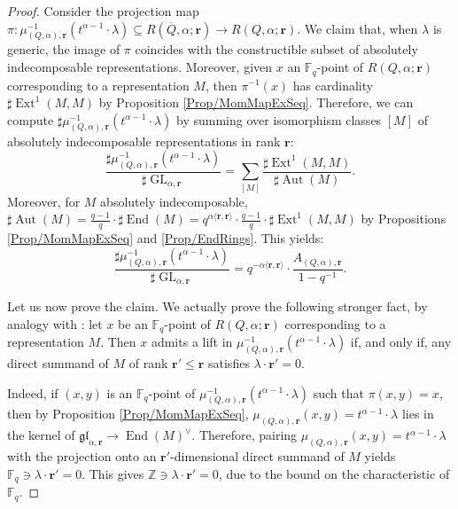 \documentclass[11pt,english]{article}
\numberwithin{equation}{section}
\numberwithin{figure}{section}
\theoremstyle{definition}
\theoremstyle{plain}
\theoremstyle{remark}
\DeclareMathOperator{\End}{End}
\DeclareMathOperator{\Aut}{Aut}
\DeclareMathOperator{\Ext}{Ext}
\DeclareMathOperator{\GL}{GL}
\newcommand\rr{\mathbf{r}}
\newcommand\ZZ{\mathbb{Z}}
\newcommand\FF{\mathbb{F}}
\begin{document}
\begin{proof}

Consider the projection map $\pi:\mu_{(Q,\alpha),\rr}^{-1}(t^{\alpha-1}\cdot\lambda)\subseteq R(\overline{Q},\alpha;\rr)\rightarrow R(Q,\alpha;\rr)$.
We claim that, when $\lambda$ is generic, the image of $\pi$ coincides
with the constructible subset of absolutely indecomposable representations.
Moreover, given $x$ an $\FF_{q}$-point of $R(Q,\alpha;\rr)$ corresponding
to a representation $M$, then $\pi^{-1}(x)$ has cardinality $\sharp\Ext^{1}(M,M)$
by Proposition \ref{Prop/MomMapExSeq}. Therefore, we can compute
$\sharp\mu_{(Q,\alpha),\rr}^{-1}(t^{\alpha-1}\cdot\lambda)$ by summing
over isomorphism classes $[M]$ of absolutely indecomposable representations
in rank $\rr$:\[
\frac{\sharp\mu_{(Q,\alpha),\rr}^{-1}(t^{\alpha-1}\cdot\lambda)}{\sharp\GL_{\alpha,\rr}}
=
\sum_{[M]}\frac{\sharp\Ext^1(M,M)}{\sharp\Aut(M)}.
\] Moreover, for $M$ absolutely indecomposable, $\sharp\Aut(M)=\frac{q-1}{q}\cdot\sharp\End(M)=q^{\alpha\langle\rr,\rr\rangle}\cdot\frac{q-1}{q}\cdot\sharp\Ext^{1}(M,M)$
by Propositions \ref{Prop/MomMapExSeq} and \ref{Prop/EndRings}.
This yields:\[
\frac{\sharp\mu_{(Q,\alpha),\rr}^{-1}(t^{\alpha-1}\cdot\lambda)}{\sharp\GL_{\alpha,\rr}}
=q^{-\alpha\langle\rr,\rr\rangle}\cdot\frac{A_{(Q,\alpha),\rr}}{1-q^{-1}}.
\]

Let us now prove the claim. We actually prove the following stronger
fact, by analogy with \cite[Thm. 3.3.]{CB01}: let $x$ be an $\FF_{q}$-point
of $R(Q,\alpha;\rr)$ corresponding to a representation $M$. Then
$x$ admits a lift in $\mu_{(Q,\alpha),\rr}^{-1}(t^{\alpha-1}\cdot\lambda)$
if, and only if, any direct summand of $M$ of rank $\rr'\leq\rr$
satisfies $\lambda\cdot\rr'=0$.

Indeed, if $(x,y)$ is an $\FF_{q}$-point of $\mu_{(Q,\alpha),\rr}^{-1}(t^{\alpha-1}\cdot\lambda)$
such that $\pi(x,y)=x$, then by Proposition \ref{Prop/MomMapExSeq},
$\mu_{(Q,\alpha),\rr}(x,y)=t^{\alpha-1}\cdot\lambda$ lies in the
kernel of $\mathfrak{gl}_{\alpha,\rr}\rightarrow\End(M)^{\vee}$.
Therefore, pairing $\mu_{(Q,\alpha),\rr}(x,y)=t^{\alpha-1}\cdot\lambda$
with the projection onto an $\rr'$-dimensional direct summand of
$M$ yields $\FF_{q}\ni\lambda\cdot\rr'=0$. This gives $\ZZ\ni\lambda\cdot\rr'=0$,
due to the bound on the characteristic of $\FF_{q}$.


\end{proof}
\end{document}
